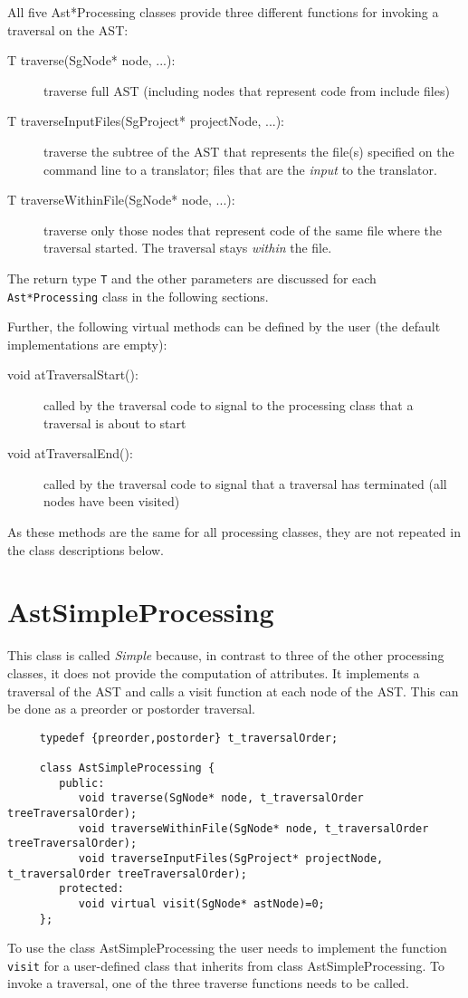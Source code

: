 All five Ast*Processing classes provide three different functions for invoking a traversal on the AST:

\begin{description}
\item[T traverse(SgNode* node, ...):] traverse full AST (including nodes that represent code from include files)
\item[T traverseInputFiles(SgProject* projectNode, ...):] traverse the subtree of the AST
    that represents the file(s) specified on the command line to a translator; files that
    are the {\em input} to the translator.
\item[T traverseWithinFile(SgNode* node, ...):] traverse only those nodes that represent 
code of the same file where the traversal started. The traversal stays {\em within} the file.
\end{description}

The return type {\tt T} and the other parameters are discussed for each {\tt Ast*Processing} class in the following sections.

Further, the following virtual methods can be defined by the user (the default
implementations are empty):
\begin{description}
\item[void atTraversalStart():] called by the traversal code to signal to the
processing class that a traversal is about to start
\item[void atTraversalEnd():] called by the traversal code to signal that a
traversal has terminated (all nodes have been visited)
\end{description}

As these methods are the same for all processing classes, they are not
repeated in the class descriptions below.

\section{AstSimpleProcessing}
\label{AstProcessing:AstSimpleProcessing}

This class is called {\em Simple} because, in contrast to three of the other
processing classes, it does not provide the computation of
attributes. It implements a traversal of the AST and calls a
visit function at each node of the AST. This can be done as
a preorder or postorder traversal.

{\indent
{\footnotesize
\begin{verbatim}
     typedef {preorder,postorder} t_traversalOrder;

     class AstSimpleProcessing {
        public:
           void traverse(SgNode* node, t_traversalOrder treeTraversalOrder);
           void traverseWithinFile(SgNode* node, t_traversalOrder treeTraversalOrder);
           void traverseInputFiles(SgProject* projectNode, t_traversalOrder treeTraversalOrder);
        protected:
           void virtual visit(SgNode* astNode)=0;
     };
\end{verbatim}
}}
To use the class AstSimpleProcessing the user needs to implement the
function {\tt visit} for a user-defined class that inherits
from class AstSimpleProcessing. To invoke a traversal, one of the three
traverse functions needs to be called.

